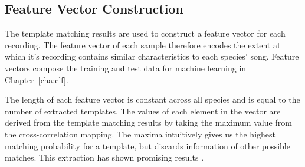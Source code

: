 \subsection{Feature Vector Construction}
The template matching results are used to construct a feature vector for each
recording.
The feature vector of each sample therefore encodes the extent at which it's
recording contains similar characteristics to each species' song.
Feature vectors compose the training and test data for machine learning in
Chapter~\ref{cha:clf}.

The length of each feature vector is constant across all species and is equal to
the number of extracted templates.
The values of each element in the vector are derived from the template matching
results by taking the maximum value from the cross-correlation mapping.
The maxima intuitively gives us the highest matching probability for a template,
but discards information of other possible matches.
This extraction has shown promising results \parencite{fodor2013}.
